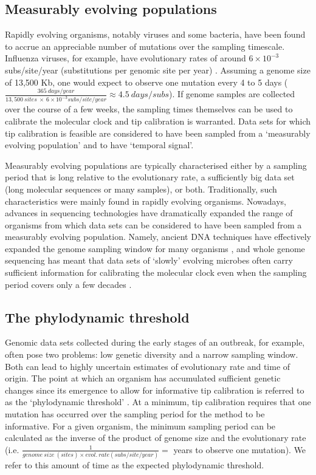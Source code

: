 \documentclass[11pt]{article}
\begin{document}
\subsection{Measurably evolving populations}
Rapidly evolving organisms, notably viruses and some bacteria, have been found to accrue an appreciable number of mutations over the sampling timescale. Influenza viruses, for example, have evolutionary rates of around $6\times10^{-3}$ subs/site/year (substitutions per genomic site per year) \citep{ghafari2022purifying, sanjuan2012molecular}. Assuming a genome size of 13,500 Kb, one would expect to observe one mutation every 4 to 5 days ($\frac{365\ days/year}{13,500\ sites\ \times\ 6\times10^{-3}subs/site/year}\approx4.5\ days/subs$). If genome samples are collected over the course of a few weeks, the sampling times themselves can be used to calibrate the molecular clock and tip calibration is warranted. Data sets for which tip calibration is feasible are considered to have been sampled from a `measurably evolving population' \citep{drummond2003measurably} and to have `temporal signal'. 

Measurably evolving populations are typically characterised either by a sampling period that is long relative to the evolutionary rate, a sufficiently big data set (long molecular sequences or many samples), or both. Traditionally, such characteristics were mainly found in rapidly evolving organisms. Nowadays, advances in sequencing technologies have dramatically expanded the range of organisms from which data sets can be considered to have been sampled from a measurably evolving population. Namely, ancient DNA techniques have effectively expanded the genome sampling window for many organisms \citep{spyrou2019ancient, duchene2020recovery}, and whole genome sequencing has meant that data sets of `slowly' evolving microbes often carry sufficient information for calibrating the molecular clock  \citep{biek2015measurably} even when the sampling period covers only a few decades \citep{menardo2019molecular}.

\subsection{The phylodynamic threshold}
Genomic data sets collected during the early stages of an outbreak, for example, often pose two problems: low genetic diversity and a narrow sampling window. Both can lead to highly uncertain estimates of evolutionary rate and time of origin. The point at which an organism has accumulated sufficient genetic changes since its emergence to allow for informative tip calibration is referred to as the ‘phylodynamic threshold’ \citep{duchene2020temporal}. At a minimum, tip calibration requires that one mutation has occurred over the sampling period for the method to be informative. For a given organism, the minimum sampling period can be calculated as the inverse of the product of genome size and the evolutionary rate (i.e. $\frac{1}{genome\ size\ (sites) \times evol.\ rate (subs/site/year)}=$ years to observe one mutation). We refer to this amount of time as the expected phylodynamic threshold. 
\end{document}
